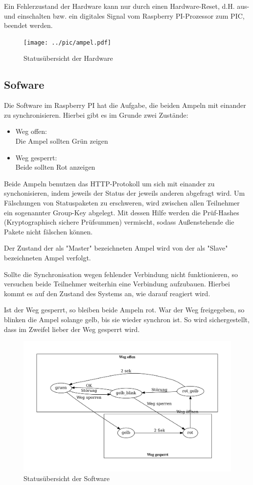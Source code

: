 \documentclass[a4paper, ngerman]{scrartcl}
\begin{document}
Ein Fehlerzustand der Hardware kann nur durch einen Hardware-Reset, d.H. aus- und einschalten bzw. ein digitales Signal vom Raspberry PI-Prozessor zum PIC, beendet werden.

\begin{figure}
	\texttt{[image: ../pic/ampel.pdf]}
	\caption{Statusübersicht der Hardware}
\end{figure}

\subsection{Sofware}
Die Software im Raspberry PI hat die Aufgabe, die beiden Ampeln mit einander zu synchronisieren. Hierbei gibt es im Grunde zwei Zustände:
\begin{itemize}
	\item Weg offen:\\
		Die Ampel sollten Grün zeigen
	\item Weg gesperrt:\\
		Beide sollten Rot anzeigen
\end{itemize}

Beide Ampeln benutzen das HTTP-Protokoll um sich mit einander zu synchonisieren, indem jeweils der Status der jeweils anderen abgefragt wird. Um Fälschungen von Statuspaketen zu erschweren, wird zwischen allen Teilnehmer ein sogenannter Group-Key abgelegt. Mit dessen Hilfe werden die Prüf-Hashes (Kryptographisch sichere Prüfsummen) vermischt, sodass Außenstehende die Pakete nicht fälschen können.

Der Zustand der als "{}Master"{} bezeichneten Ampel wird von der als "{}Slave"{} bezeichneten Ampel verfolgt. 

Sollte die Synchronisation wegen fehlender Verbindung nicht funktionieren, so versuchen beide Teilnehmer weiterhin eine Verbindung aufzubauen. Hierbei kommt es auf den Zustand des Systems an, wie darauf reagiert wird.

Ist der Weg gesperrt, so bleiben beide Ampeln rot. War der Weg freigegeben, so blinken die Ampel solange gelb, bis sie wieder synchron ist. So wird sichergestellt, dass im Zweifel lieber der Weg gesperrt wird.

\begin{figure}
	\includegraphics[keepaspectratio, width=\textwidth]{system_statemachine.pdf}
	\caption{Statusübersicht der Software}
\end{figure}
\end{document}
